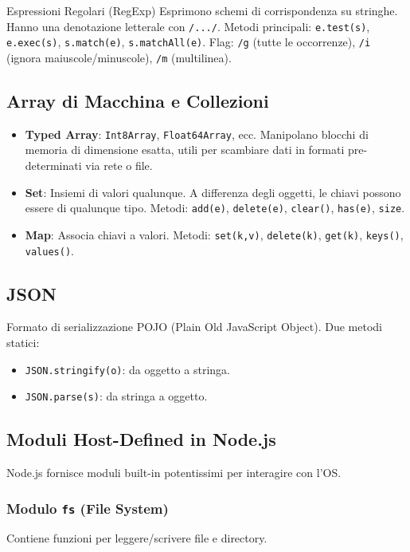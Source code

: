 \documentclass[12pt,a4paper]{article}
\begin{document}
\begin{concept}{Espressioni Regolari (RegExp)}
Esprimono schemi di corrispondenza su stringhe. Hanno una denotazione letterale con \texttt{/.../}.
Metodi principali: \texttt{e.test(s)}, \texttt{e.exec(s)}, \texttt{s.match(e)}, \texttt{s.matchAll(e)}.
Flag: \texttt{/g} (tutte le occorrenze), \texttt{/i} (ignora maiuscole/minuscole), \texttt{/m} (multilinea).
\end{concept}

\subsection{Array di Macchina e Collezioni}
\begin{itemize}
    \item \textbf{Typed Array}: \texttt{Int8Array}, \texttt{Float64Array}, ecc. Manipolano blocchi di memoria di dimensione esatta, utili per scambiare dati in formati pre-determinati via rete o file.
    \item \textbf{Set}: Insiemi di valori qualunque. A differenza degli oggetti, le chiavi possono essere di qualunque tipo. Metodi: \texttt{add(e)}, \texttt{delete(e)}, \texttt{clear()}, \texttt{has(e)}, \texttt{size}.
    \item \textbf{Map}: Associa chiavi a valori. Metodi: \texttt{set(k,v)}, \texttt{delete(k)}, \texttt{get(k)}, \texttt{keys()}, \texttt{values()}.
\end{itemize}

\subsection{JSON}
Formato di serializzazione POJO (Plain Old JavaScript Object). Due metodi statici:
\begin{itemize}
    \item \texttt{JSON.stringify(o)}: da oggetto a stringa.
    \item \texttt{JSON.parse(s)}: da stringa a oggetto.
\end{itemize}

\subsection{Moduli Host-Defined in Node.js}
Node.js fornisce moduli built-in potentissimi per interagire con l'OS.

\subsubsection{Modulo \texttt{fs} (File System)}
Contiene funzioni per leggere/scrivere file e directory.
\end{document}
